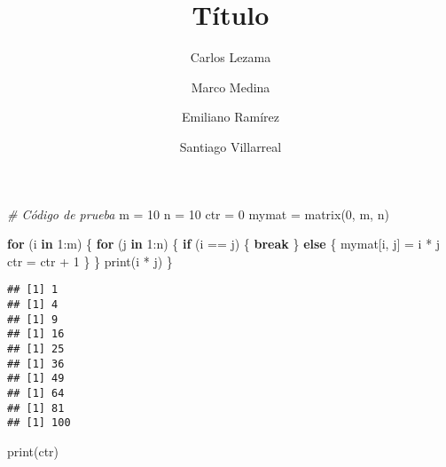 \documentclass[9pt,twocolumn,twoside,]{pnas-new}
\title{Título}
\author[a,1,2]{Carlos Lezama}
\author[a,1,2]{Marco Medina}
\author[a,1,2]{Emiliano Ramírez}
\author[a,1,2]{Santiago Villarreal}
\affil[a]{Instituto Tecnológico Autónomo de México}
\newenvironment{Shaded}{\begin{snugshade}}{\end{snugshade}}
\newcommand{\CommentTok}[1]{\textcolor[rgb]{0.56,0.35,0.01}{\textit{#1}}}
\newcommand{\ControlFlowTok}[1]{\textcolor[rgb]{0.13,0.29,0.53}{\textbf{#1}}}
\newcommand{\DecValTok}[1]{\textcolor[rgb]{0.00,0.00,0.81}{#1}}
\newcommand{\FunctionTok}[1]{\textcolor[rgb]{0.00,0.00,0.00}{#1}}
\newcommand{\NormalTok}[1]{#1}
\newcommand{\OtherTok}[1]{\textcolor[rgb]{0.56,0.35,0.01}{#1}}
\newcommand{\SpecialCharTok}[1]{\textcolor[rgb]{0.00,0.00,0.00}{#1}}
\begin{document}
\verticaladjustment{-2pt}

\maketitle
\thispagestyle{firststyle}


\acknow{}

\lipsum[1-1]

\begin{Shaded}
\begin{Highlighting}[]
\CommentTok{\# Código de prueba}
\NormalTok{m }\OtherTok{=} \DecValTok{10}
\NormalTok{n }\OtherTok{=} \DecValTok{10}
\NormalTok{ctr }\OtherTok{=} \DecValTok{0}
\NormalTok{mymat }\OtherTok{=} \FunctionTok{matrix}\NormalTok{(}\DecValTok{0}\NormalTok{, m, n)}

\ControlFlowTok{for}\NormalTok{ (i }\ControlFlowTok{in} \DecValTok{1}\SpecialCharTok{:}\NormalTok{m) \{}
  \ControlFlowTok{for}\NormalTok{ (j }\ControlFlowTok{in} \DecValTok{1}\SpecialCharTok{:}\NormalTok{n) \{}
    \ControlFlowTok{if}\NormalTok{ (i }\SpecialCharTok{==}\NormalTok{ j) \{}
      \ControlFlowTok{break}
\NormalTok{    \} }\ControlFlowTok{else}\NormalTok{ \{}
\NormalTok{      mymat[i, j] }\OtherTok{=}\NormalTok{ i }\SpecialCharTok{*}\NormalTok{ j}
\NormalTok{      ctr }\OtherTok{=}\NormalTok{ ctr }\SpecialCharTok{+} \DecValTok{1}
\NormalTok{    \}}
\NormalTok{  \}}
  \FunctionTok{print}\NormalTok{(i }\SpecialCharTok{*}\NormalTok{ j)}
\NormalTok{\}}
\end{Highlighting}
\end{Shaded}

\begin{verbatim}
## [1] 1
## [1] 4
## [1] 9
## [1] 16
## [1] 25
## [1] 36
## [1] 49
## [1] 64
## [1] 81
## [1] 100
\end{verbatim}

\begin{Shaded}
\begin{Highlighting}[]
\FunctionTok{print}\NormalTok{(ctr)}
\end{Highlighting}
\end{Shaded}
\end{document}
